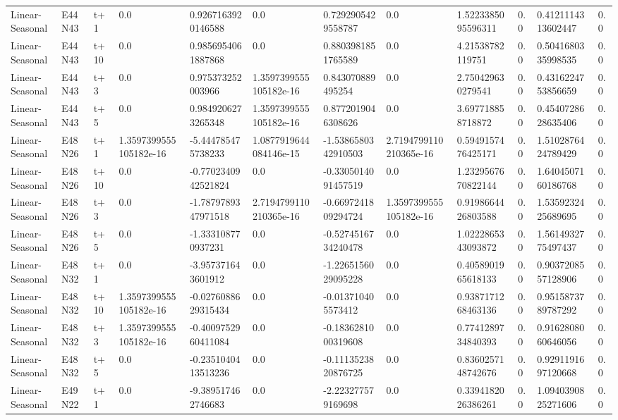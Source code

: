 \begin{landscape}
\begin{longtable}{llllllllllll}
Linear-Seasonal & E44N43 & t+1 & 0.0 & 0.9267163920146588 & 0.0 & 0.7292905429558787 & 0.0 & 1.5223385095596311 & 0.0 & 0.4121114313602447 & 0.0 \\
Linear-Seasonal & E44N43 & t+10 & 0.0 & 0.9856954061887868 & 0.0 & 0.8803981851765589 & 0.0 & 4.21538782119751 & 0.0 & 0.5041680335998535 & 0.0 \\
Linear-Seasonal & E44N43 & t+3 & 0.0 & 0.975373252003966 & 1.3597399555105182e-16 & 0.843070889495254 & 0.0 & 2.750429630279541 & 0.0 & 0.4316224753856659 & 0.0 \\
Linear-Seasonal & E44N43 & t+5 & 0.0 & 0.9849206273265348 & 1.3597399555105182e-16 & 0.8772019046308626 & 0.0 & 3.697718858718872 & 0.0 & 0.4540728628635406 & 0.0 \\
Linear-Seasonal & E48N26 & t+1 & 1.3597399555105182e-16 & -5.444785475738233 & 1.0877919644084146e-15 & -1.5386580342910503 & 2.7194799110210365e-16 & 0.5949157476425171 & 0.0 & 1.5102876424789429 & 0.0 \\
Linear-Seasonal & E48N26 & t+10 & 0.0 & -0.7702340942521824 & 0.0 & -0.3305014091457519 & 0.0 & 1.2329567670822144 & 0.0 & 1.6404507160186768 & 0.0 \\
Linear-Seasonal & E48N26 & t+3 & 0.0 & -1.7879789347971518 & 2.7194799110210365e-16 & -0.6697241809294724 & 1.3597399555105182e-16 & 0.9198664426803588 & 0.0 & 1.5359232425689695 & 0.0 \\
Linear-Seasonal & E48N26 & t+5 & 0.0 & -1.333108770937231 & 0.0 & -0.5274516734240478 & 0.0 & 1.0222865343093872 & 0.0 & 1.5614932775497437 & 0.0 \\
Linear-Seasonal & E48N32 & t+1 & 0.0 & -3.957371643601912 & 0.0 & -1.2265156029095228 & 0.0 & 0.4058901965618133 & 0.0 & 0.9037208557128906 & 0.0 \\
Linear-Seasonal & E48N32 & t+10 & 1.3597399555105182e-16 & -0.0276088629315434 & 0.0 & -0.013710405573412 & 0.0 & 0.9387171268463136 & 0.0 & 0.9515873789787292 & 0.0 \\
Linear-Seasonal & E48N32 & t+3 & 1.3597399555105182e-16 & -0.4009752960411084 & 0.0 & -0.1836281000319608 & 0.0 & 0.7741289734840393 & 0.0 & 0.9162808060646056 & 0.0 \\
Linear-Seasonal & E48N32 & t+5 & 0.0 & -0.2351040413513236 & 0.0 & -0.1113523820876725 & 0.0 & 0.8360257148742676 & 0.0 & 0.9291191697120668 & 0.0 \\
Linear-Seasonal & E49N22 & t+1 & 0.0 & -9.389517462746683 & 0.0 & -2.223277579169698 & 0.0 & 0.3394182026386261 & 0.0 & 1.0940390825271606 & 0.0 \\

\end{longtable}
\end{landscape}
